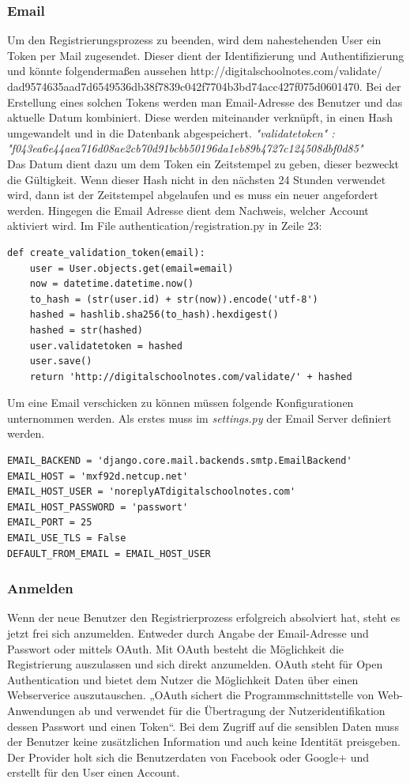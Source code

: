 \subsubsection{Email}
Um den Registrierungsprozess zu beenden, wird dem nahestehenden User ein Token per Mail zugesendet. Dieser dient der Identifizierung und Authentifizierung und könnte folgendermaßen aussehen http://digitalschoolnotes.com/validate/
\\dad9574635aad7d6549536db38f7839c042f7704b3bd74acc427f075d0601470. Bei der Erstellung eines solchen Tokens werden man Email-Adresse des Benutzer und das aktuelle Datum kombiniert. Diese werden miteinander verknüpft, in einen Hash umgewandelt und in die Datenbank abgespeichert. \textit{"validatetoken" : 
\\"f043ea6e44aea716d08ae2cb70d91bcbb50196da1eb89b4727c124508dbf0d85"}\\
Das Datum dient dazu um dem Token ein Zeitstempel zu geben, dieser bezweckt die Gültigkeit. Wenn dieser Hash nicht in den nächsten 24 Stunden verwendet wird, dann ist der Zeitstempel abgelaufen und es muss ein neuer angefordert werden. Hingegen die Email Adresse dient dem Nachweis, welcher Account aktiviert wird.
Im File authentication/registration.py in Zeile 23:
\begin{lstlisting}
def create_validation_token(email):
    user = User.objects.get(email=email)
    now = datetime.datetime.now()
    to_hash = (str(user.id) + str(now)).encode('utf-8')
    hashed = hashlib.sha256(to_hash).hexdigest()
    hashed = str(hashed)
    user.validatetoken = hashed
    user.save()
    return 'http://digitalschoolnotes.com/validate/' + hashed
\end{lstlisting}

Um eine Email verschicken zu können müssen folgende Konfigurationen unternommen werden. Als erstes muss im \textit{settings.py} der Email Server definiert werden.
\begin{lstlisting}
EMAIL_BACKEND = 'django.core.mail.backends.smtp.EmailBackend'
EMAIL_HOST = 'mxf92d.netcup.net'
EMAIL_HOST_USER = 'noreplyATdigitalschoolnotes.com'
EMAIL_HOST_PASSWORD = 'passwort'
EMAIL_PORT = 25
EMAIL_USE_TLS = False
DEFAULT_FROM_EMAIL = EMAIL_HOST_USER
\end{lstlisting}

\subsubsection{Anmelden}
Wenn der neue Benutzer den Registrierprozess erfolgreich absolviert hat, steht es jetzt frei sich anzumelden. Entweder durch Angabe der Email-Adresse und Passwort oder mittels OAuth. Mit OAuth besteht die Möglichkeit die Registrierung auszulassen und sich direkt anzumelden. OAuth steht für Open Authentication und bietet dem Nutzer die Möglichkeit Daten über einen Webserverice auszutauschen. „OAuth sichert die Programmschnittstelle von Web-Anwendungen ab und verwendet für die Übertragung der Nutzeridentifikation dessen Passwort und einen Token“\cite{OAUTH}. Bei dem Zugriff auf die sensiblen Daten muss der Benutzer keine zusätzlichen Information und auch keine Identität preisgeben. Der Provider holt sich die Benutzerdaten von Facebook oder Google+ und erstellt für den User einen Account.

